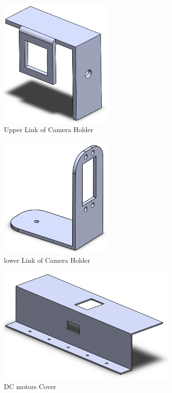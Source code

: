 \documentclass[12pt]{article}
\begin{document}
\begin{figure}[H]
	\centering
	\includegraphics[width =0.5\textwidth]{Fig/solid/cam-holder-2.png}
	\caption{Upper Link of Camera Holder}
\end{figure}

\begin{figure}[H]
	\centering
	\includegraphics[width =0.5\textwidth]{Fig/solid/cam-holder-1.png}
	\caption{lower Link of Camera Holder}
\end{figure}


\begin{figure}[H]
	\centering
	\includegraphics[width =0.8\textwidth]{Fig/solid/Motor-cover.png}
	\caption{DC motors Cover}
\end{figure}

\newpage
\appendix

\newpage
 


\end{document}
